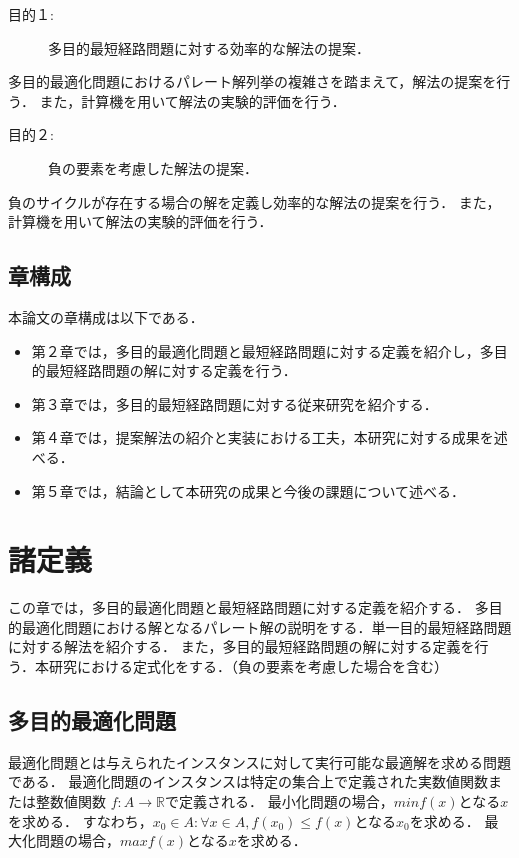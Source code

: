 \documentclass[12pt]{optlab-bachelor}
\begin{document}
\begin{description}
  \item[目的１:]
  多目的最短経路問題に対する効率的な解法の提案．
\end{description}

多目的最適化問題におけるパレート解列挙の複雑さを踏まえて，解法の提案を行う．
また，計算機を用いて解法の実験的評価を行う．

\begin{description}
  \item[目的２:]
  負の要素を考慮した解法の提案．
\end{description}

負のサイクルが存在する場合の解を定義し効率的な解法の提案を行う．
また，計算機を用いて解法の実験的評価を行う．

\section{章構成}

  本論文の章構成は以下である．
  \begin{itemize}
  \item 第２章では，多目的最適化問題と最短経路問題に対する定義を紹介し，多目的最短経路問題の解に対する定義を行う．
  \item 第３章では，多目的最短経路問題に対する従来研究を紹介する．
  \item 第４章では，提案解法の紹介と実装における工夫，本研究に対する成果を述べる．
  \item 第５章では，結論として本研究の成果と今後の課題について述べる．
\end{itemize}

\chapter{諸定義}
この章では，多目的最適化問題と最短経路問題に対する定義を紹介する．
多目的最適化問題における解となるパレート解の説明をする．単一目的最短経路問題に対する解法を紹介する．
また，多目的最短経路問題の解に対する定義を行う．本研究における定式化をする．（負の要素を考慮した場合を含む）

\section{多目的最適化問題}
最適化問題とは与えられたインスタンスに対して実行可能な最適解を求める問題である．
最適化問題のインスタンスは特定の集合上で定義された実数値関数または整数値関数
$f : A \rightarrow \mathbb{R}$で定義される．
最小化問題の場合，$minf(x)$となる$x$を求める．
すなわち，$x_0 \in A : \forall x\in A , f(x_0) \leq f(x) $となる$x_0$を求める．
最大化問題の場合，$maxf(x)$となる$x$を求める．
\end{document}
